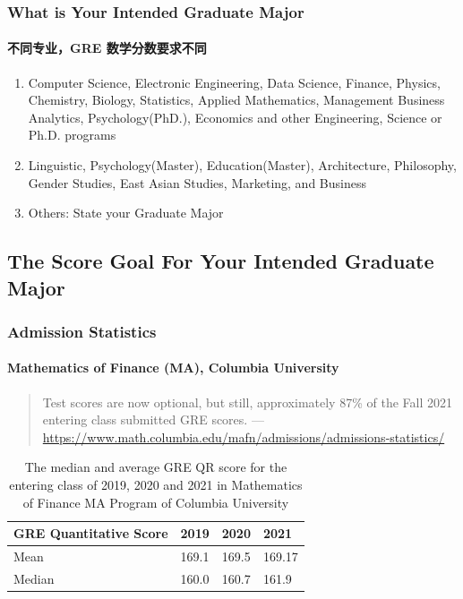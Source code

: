\documentclass[
	11pt, %
]{beamer}
\begin{document}
\begin{frame}
	\frametitle{What is Your Intended Graduate Major}
	\framesubtitle{不同专业，GRE 数学分数要求不同} %
	
	\begin{enumerate}
		\item Computer Science, Electronic Engineering, Data Science, Finance,
Physics, Chemistry, Biology, Statistics, Applied Mathematics,
Management Business Analytics, Psychology(PhD.), Economics and
other Engineering, Science or Ph.D. programs
		\item Linguistic, Psychology(Master), Education(Master), Architecture,
Philosophy, Gender Studies, East Asian Studies, Marketing, and
Business
\item Others: State your Graduate Major
	\end{enumerate}
\end{frame}


\subsection{The Score Goal For Your Intended Graduate Major}


\begin{frame}
	\frametitle{Admission Statistics}
	\framesubtitle{Mathematics of Finance (MA), Columbia University}
	\begin{quote}
	Test scores are now optional, but still, approximately \alert{87\%} of the Fall 2021 entering class submitted GRE scores.
	---\url{https://www.math.columbia.edu/mafn/admissions/admissions-statistics/}
	\end{quote}
	\bigskip %
	\begin{table}
		\begin{tabular}{l l l l}
			\toprule
			\textbf{GRE Quantitative Score} & \textbf{2019} & \textbf{2020} & \textbf{2021}\\
			\midrule
			Mean & 169.1 & 169.5 & 169.17 \\
			Median & 160.0 & 160.7 & 161.9 \\
			\bottomrule
		\end{tabular}
		\caption{The median and average GRE QR score for the entering class of 2019, 2020 and 2021 in Mathematics of Finance MA Program of Columbia University}
	\end{table}
\end{frame}
\end{document}
